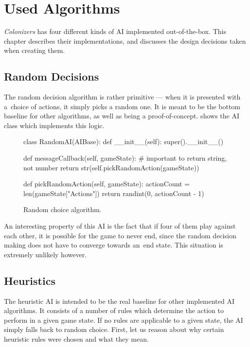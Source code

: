\chapter{Used Algorithms}

\emph{Colonizers} has four different kinds of AI implemented out-of-the-box.
This chapter describes their implementations, and discusses the design decisions
taken when creating them.

\section{Random Decisions}

The random decision algorithm is rather primitive --- when it is presented with
a~choice of actions, it simply picks a random one. It is meant to be
the bottom baseline for other algorithms,
as well as being a proof-of-concept.  shows the AI class which
implements this logic.

\begin{figure}[h!]
\begin{code}[commandchars=\\\{\},codes={\catcode`\$=3\catcode`\^=7\catcode`\_=8}]
class RandomAI(AIBase):
    def \_\_init\_\_(self):
        super().\_\_init\_\_()

    def messageCallback(self, gameState):
        # important to return string, not number
        return str(self.pickRandomAction(gameState))

    def pickRandomAction(self, gameState):
        actionCount = len(gameState["Actions"])
        return randint(0, actionCount - 1)
\end{code}
\caption{Random choice algorithm.}\label{algo:random}
\end{figure}

An interesting property of this AI is the fact that if four of them play
against each other, it is possible for the game to never end, since
the random decision making does not have to converge towards an~end state.
This situation is extremely unlikely however.

\section{Heuristics}
\label{sec:algoheur}

The heuristic AI is intended to be the real baseline for other implemented AI algorithms.
It consists of a number of rules which determine the action to perform in a given
game state. If no rules are applicable to a given state, the AI simply
falls back to random choice. First, let us reason about why certain heuristic rules
were chosen and what they mean.

